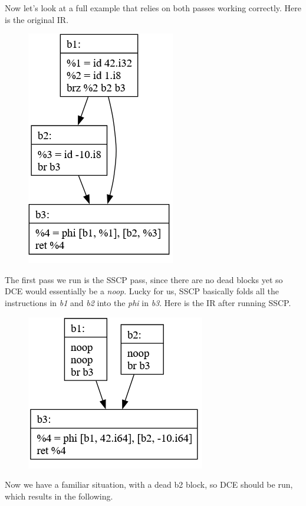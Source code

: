\documentclass[11pt, a4paper, titlepage]{article}
\begin{document}
Now let's look at a full example that relies on both passes working correctly.
Here is the original IR.

\begin{figure}[H]
  \centering
  \includegraphics[scale=0.3]{images/i11.png}
\end{figure}

The first pass we run is the SSCP pass,
since there are no dead blocks yet so DCE would essentially be a \textit{noop}.
Lucky for us, SSCP basically folds all the instructions in \textit{b1} and \textit{b2} into the \textit{phi} in \textit{b3}.
Here is the IR after running SSCP.

\begin{figure}[H]
  \centering
  \includegraphics[scale=0.3]{images/i12.png}
\end{figure}

Now we have a familiar situation, with a dead b2 block, so DCE should be run, which results in the following.
\end{document}
